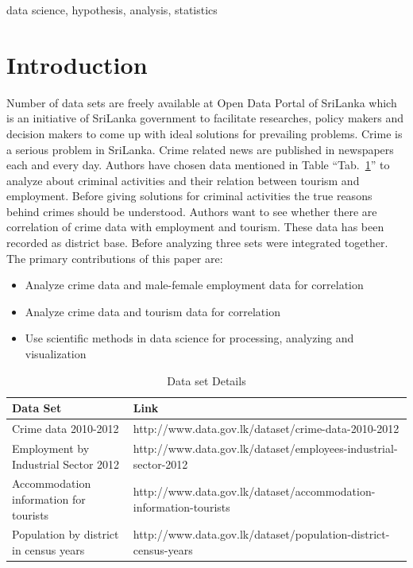 \documentclass[conference]{IEEEtran}
\begin{document}
\begin{IEEEkeywords}
data science, hypothesis, analysis, statistics
\end{IEEEkeywords}

\section{Introduction}
Number of data sets are freely available at Open Data Portal \cite{b2} of SriLanka which is an initiative of SriLanka government to facilitate researches, policy makers and decision makers to come up with ideal solutions for prevailing problems. Crime is a serious problem in SriLanka. Crime related news are published in newspapers each and every day. Authors have chosen data mentioned in Table ``Tab.~\ref{tab1}'' to analyze about criminal activities and their relation between tourism and employment.
Before giving solutions for criminal activities the true reasons behind crimes should be understood. Authors want to see whether there are correlation of crime data with employment and tourism. These data has been recorded as district base. Before analyzing three sets were integrated together. The primary contributions of this paper are:
\begin{itemize}
\item Analyze crime data and male-female employment data for correlation
\item Analyze crime data and tourism data for correlation
\item Use scientific methods in data science for processing, analyzing and visualization
\end{itemize}

\begin{table}[htbp]
\caption{Data set Details}
\begin{center}
\begin{tabular}{|p{3cm}|p{6cm}|}
\hline
\textbf{Data Set}& \textbf{Link}\\[14pt]
\hline
Crime data 2010-2012 & http://www.data.gov.lk/dataset/crime-data-2010-2012 \\[5pt]
Employment by Industrial Sector 2012& http://www.data.gov.lk/dataset/employees-industrial-sector-2012\\[5pt]
Accommodation information for tourists& http://www.data.gov.lk/dataset/accommodation-information-tourists\\[5pt]
Population by district in census years& http://www.data.gov.lk/dataset/population-district-census-years\\[5pt]
\hline
\end{tabular}
\label{tab1}
\end{center}
\end{table}
\end{document}
